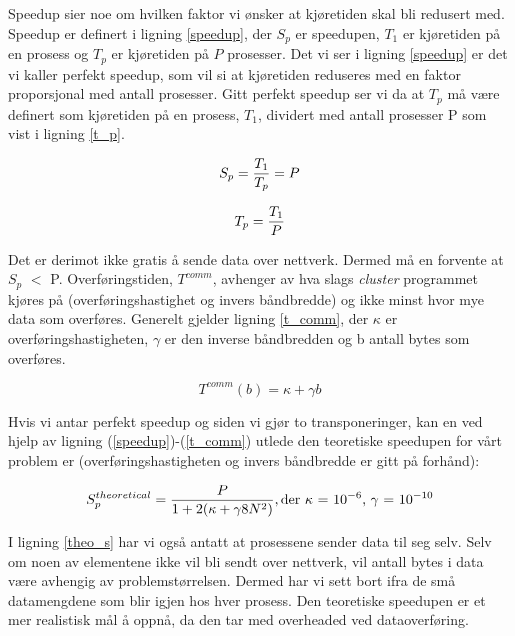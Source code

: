 \documentclass{article}
\begin{document}
Speedup sier noe om hvilken faktor vi ønsker at kjøretiden skal bli redusert med. Speedup er definert i ligning \ref{speedup}, der $S_p$ er speedupen, $T_1$ er kjøretiden på en prosess og $T_p$ er kjøretiden på $P$ prosesser. Det vi ser i ligning \ref{speedup} er det vi kaller perfekt speedup, som vil si at kjøretiden reduseres med en faktor proporsjonal med antall prosesser. Gitt perfekt speedup ser vi da at $T_p$ må være definert som kjøretiden på en prosess, $T_1$, dividert med antall prosesser P som vist i ligning \ref{t_p}.  

\begin{equation}
	\label{speedup}
	S_{p} = {T_{1} \over T_{p}} = P
\end{equation} 

\begin{equation}
	\label{t_p}
	T_{p} = {T_{1} \over P}
\end{equation}

Det er derimot ikke gratis å sende data over nettverk. Dermed må en forvente at $S_p$ $<$ P. Overføringstiden, $T^{comm}$, avhenger av hva slags \emph{cluster} programmet kjøres på (overføringshastighet og invers båndbredde) og ikke minst hvor mye data som overføres. Generelt gjelder ligning \ref{t_comm}, der $\kappa$ er overføringshastigheten, $\gamma$ er den inverse båndbredden og b antall bytes som overføres.

\begin{equation}
	\label{t_comm}
	T^{comm}(b) = \kappa + \gamma b
\end{equation} 

Hvis vi antar perfekt speedup og siden vi gjør to transponeringer, kan en ved hjelp av ligning (\ref{speedup})-(\ref{t_comm}) utlede den teoretiske speedupen for vårt problem er (overføringshastigheten og invers båndbredde er gitt på forhånd):

\begin{equation}
	\label{theo_s}
	S_{p}^{theoretical} = {P \over 1 + 2(\kappa + \gamma 8N^{2})}, \text{der $\kappa$ = $10^{-6}$, $\gamma$ = $10^{-10}$}
\end{equation}


I ligning \ref{theo_s} har vi også antatt at prosessene sender data til seg selv. Selv om noen av elementene ikke vil bli sendt over nettverk, vil antall bytes i data være avhengig av problemstørrelsen. Dermed har vi sett bort ifra de små datamengdene som blir igjen hos hver prosess. Den teoretiske speedupen er et mer realistisk mål å oppnå, da den tar med overheaded ved dataoverføring. \\ 
\end{document}
